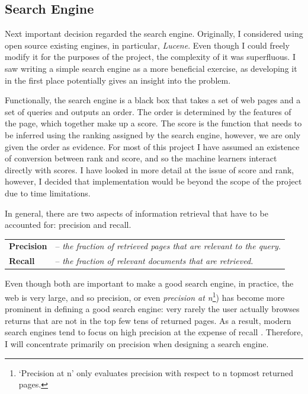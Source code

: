 \documentclass[12pt,notitlepage,twoside]{scrreprt}
\begin{document}
\subsection{Search Engine}

Next important decision regarded the search engine.  Originally, I considered
using open source existing engines, in particular, \textit{Lucene}. Even though I could
freely modify it for the purposes of the project, the complexity of it was
superfluous. I saw writing a simple search engine as a more beneficial
exercise, as developing it in the first place potentially gives an insight into
the problem.

Functionally, the search engine is a black box that takes a set of web pages and a set of
queries and outputs an order. The order is determined by the features of the page, which
together make up a score. The score is the function that needs to be inferred using the
ranking assigned by the search engine, however, we are only given the order as evidence.
For most of this project I have assumed an existence of conversion between rank and score,
and so the machine learners interact directly with scores. I have looked in more detail at
the issue of score and rank, however, I decided that implementation would be beyond the
scope of the project due to time limitations.

In general, there are two aspects of information retrieval that have to be accounted for:
precision and recall.  

\begin{tabular}{l l}
	\textbf{Precision} & -- \textit{the fraction of retrieved pages that are
relevant to the query.}  \\
\textbf{Recall} & -- \textit{the fraction of relevant documents that are
retrieved.} \\ 
\end{tabular}

Even though both are important to make a good search engine, in practice, the
web is very large, and so precision, or even \textit{precision at n}\footnote{`Precision
at n' only evaluates precision with respect to n topmost returned pages.}) has become more
prominent in defining a good search engine: very rarely the user actually browses returns
that are not in the top few tens of returned pages. As a result, modern search engines tend
to focus on high precision at the expense of recall \cite{GOOGLE}. Therefore, I will
concentrate primarily on precision when designing a search engine.
\end{document}
